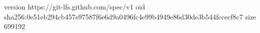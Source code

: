 version https://git-lfs.github.com/spec/v1
oid sha256:0e51eb294cb457e97587f6e6d9a0496fc4e99b4949e86d30de3b544fccecf8c7
size 699192
